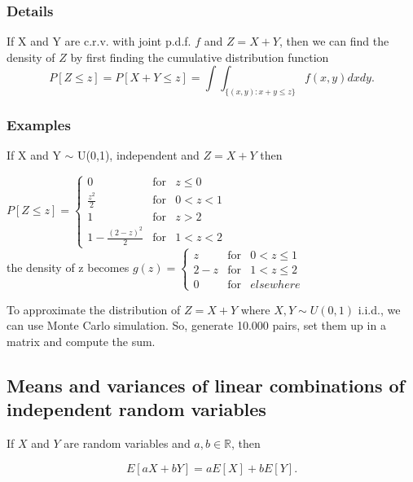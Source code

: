 \documentclass[12pt,a4paper]{article}
\theoremstyle{regla}
\theoremstyle{remark}
\theoremstyle{definition}
\theoremstyle{nonumberbreak}
\begin{document}
\subsubsection{Details}
If X and Y are c.r.v. with joint p.d.f. $f$ and $Z=X+Y$, then we can find the density of $Z$ by first finding the cumulative distribution function $$P[Z \leq z]=P[X+Y \leq z]=\int\int_{\{(x,y):x+y \leq z\}} f(x,y)dxdy.$$
\subsubsection{Examples}
\begin{xmpl}

If X and Y $\sim$ U(0,1), independent and $Z=X+Y$ then 
 
$P[Z \leq z]= \left\{ \begin{array}{rcl}
0 & \mbox{for}& z \leq0\\
\frac{z^2}{2}& \mbox{for} & 0<z<1\\
1 & \mbox{for}& z>2\\
1-\frac{(2-z)^2}{2}& \mbox{for}&1<z<2
\end{array}\right.$
\\
the density of z becomes \newline
$g(z)= \left\{ \begin{array}{rcl}
z & \mbox{for}& 0 <z \leq 1\\
2-z& \mbox{for} & 1< z \leq 2\\
0 & \mbox{for}& elsewhere
\end{array}\right.$
\end{xmpl}
\begin{xmpl}

To approximate the distribution of $Z=X+Y$ where $X,Y \sim U(0,1)$ i.i.d., we can use Monte Carlo simulation. So, generate 10.000 pairs, set them up in a matrix and compute the sum. 
\end{xmpl}

\subsection{Means and variances of linear combinations of independent random variables}
\begin{fbox}
\begin{minipage}{0.97\textwidth}
If $X$ and $Y$ are random variables and $a,b\in\mathbb{R}$, then

$$
E[aX+bY] = aE[X]+bE[Y].
$$
\end{minipage}
\end{fbox}
\end{document}
